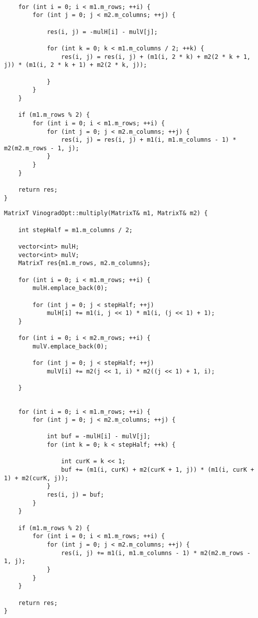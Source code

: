 \begin{lstlisting}[label=lst:vin_2, caption=Функция умножения матриц методом Винограда (часть 2)]

    for (int i = 0; i < m1.m_rows; ++i) {
        for (int j = 0; j < m2.m_columns; ++j) {

            res(i, j) = -mulH[i] - mulV[j];

            for (int k = 0; k < m1.m_columns / 2; ++k) {
                res(i, j) = res(i, j) + (m1(i, 2 * k) + m2(2 * k + 1, j)) * (m1(i, 2 * k + 1) + m2(2 * k, j));
            
            }
        }
    }

    if (m1.m_rows % 2) {
        for (int i = 0; i < m1.m_rows; ++i) {
            for (int j = 0; j < m2.m_columns; ++j) {  
                res(i, j) = res(i, j) + m1(i, m1.m_columns - 1) * m2(m2.m_rows - 1, j);
            }
        }
    }

    return res;    
}
\end{lstlisting}

\clearpage

\begin{lstlisting}[label=lst:vin_opt_1, caption=Функция умножения матриц оптимизированным методом Винограда (часть 1)]
MatrixT VinogradOpt::multiply(MatrixT& m1, MatrixT& m2) {

    int stepHalf = m1.m_columns / 2;

    vector<int> mulH;
    vector<int> mulV;
    MatrixT res{m1.m_rows, m2.m_columns};

    for (int i = 0; i < m1.m_rows; ++i) {
        mulH.emplace_back(0);

        for (int j = 0; j < stepHalf; ++j) 
            mulH[i] += m1(i, j << 1) * m1(i, (j << 1) + 1); 
    }

    for (int i = 0; i < m2.m_rows; ++i) {
        mulV.emplace_back(0);

        for (int j = 0; j < stepHalf; ++j) 
            mulV[i] += m2(j << 1, i) * m2((j << 1) + 1, i);
        
    }
\end{lstlisting}

\clearpage

\begin{lstlisting}[label=lst:vin_opt_2, caption=Функция умножения матриц оптимизированным методом Винограда (часть 2)]

    for (int i = 0; i < m1.m_rows; ++i) {
        for (int j = 0; j < m2.m_columns; ++j) {

            int buf = -mulH[i] - mulV[j];
            for (int k = 0; k < stepHalf; ++k) {

                int curK = k << 1;
                buf += (m1(i, curK) + m2(curK + 1, j)) * (m1(i, curK + 1) + m2(curK, j));
            }
            res(i, j) = buf;
        }
    }

    if (m1.m_rows % 2) {
        for (int i = 0; i < m1.m_rows; ++i) {
            for (int j = 0; j < m2.m_columns; ++j) {                 
                res(i, j) += m1(i, m1.m_columns - 1) * m2(m2.m_rows - 1, j);
            }
        }
    }

    return res;
} 
\end{lstlisting}

